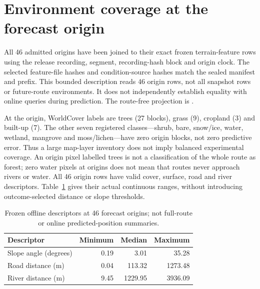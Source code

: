 \section{Environment coverage at the forecast origin}
\label{sec:origin-environment}\hypertarget{sec:origin-environment}{}
All 46 admitted origins have been joined to their exact frozen terrain-feature
rows using the release recording, segment, recording-hash block and
origin clock. The selected feature-file hashes and condition-source hashes
match the sealed manifest and prefix. This bounded description reads 46
origin rows, not all snapshot rows or future-route environments. It does not
independently establish equality with online queries during prediction.
The route-free projection is
.

At the origin, WorldCover labels are trees (27 blocks), grass (9), cropland
(3) and built-up (7). The other seven registered classes---shrub, bare,
snow/ice, water, wetland, mangrove and moss/lichen---have zero origin blocks,
not zero predictive error. Thus a large map-layer inventory does not imply
balanced experimental coverage. An origin pixel labelled trees is not a
classification of the whole route as forest; zero water pixels at origins
does not mean that routes never approach rivers or water.
All 46 origin rows have valid cover, surface, road and river descriptors.
Table~\ref{tab:origin-environment-range} gives their actual continuous ranges,
without introducing outcome-selected distance or slope thresholds.

\begin{table}[htbp]
\centering\small
\caption{Frozen offline descriptors at 46 forecast origins; not full-route
or online predicted-position summaries.}
\label{tab:origin-environment-range}\hypertarget{tab:origin-environment-range}{}
\begin{tabular}{lrrr}
\toprule
Descriptor & Minimum & Median & Maximum\\
\midrule
Slope angle (degrees) & 0.19 & 3.01 & 35.28\\
Road distance (m) & 0.04 & 113.32 & 1273.48\\
River distance (m) & 9.45 & 1229.95 & 3936.09\\
\bottomrule
\end{tabular}
\end{table}


